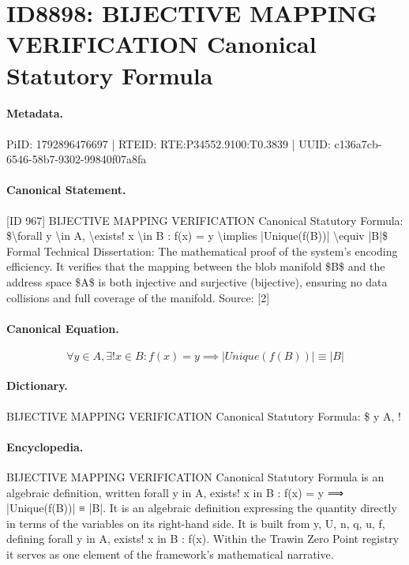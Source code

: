 \section*{ID8898: BIJECTIVE MAPPING VERIFICATION Canonical Statutory Formula}
\paragraph{Metadata.}
PiID: 1792896476697 | RTEID: RTE:P34552.9100:T0.3839 | UUID: c136a7cb-6546-58b7-9302-99840f07a8fa

\paragraph{Canonical Statement.}
[ID 967] BIJECTIVE MAPPING VERIFICATION Canonical Statutory Formula: \$\textbackslash{}forall y \textbackslash{}in A, \textbackslash{}exists! x \textbackslash{}in B : f(x) = y \textbackslash{}implies |Unique(f(B))| \textbackslash{}equiv |B|\$ Formal Technical Dissertation: The mathematical proof of the system's encoding efficiency. It verifies that the mapping between the blob manifold \$B\$ and the address space \$A\$ is both injective and surjective (bijective), ensuring no data collisions and full coverage of the manifold. Source: [2]

\paragraph{Canonical Equation.}
\[
\forall y \in A, \exists! x \in B : f(x) = y \implies |Unique(f(B))| \equiv |B|
\]

\paragraph{Dictionary.}
BIJECTIVE MAPPING VERIFICATION Canonical Statutory Formula: \$ y A, !

\paragraph{Encyclopedia.}
BIJECTIVE MAPPING VERIFICATION Canonical Statutory Formula is an algebraic definition, written forall y in A, exists! x in B : f(x) = y ⟹ |Unique(f(B))| ≡ |B|. It is an algebraic definition expressing the quantity directly in terms of the variables on its right-hand side. It is built from y, U, n, q, u, f, defining forall y in A, exists! x in B : f(x). Within the Trawin Zero Point registry it serves as one element of the framework's mathematical narrative.
